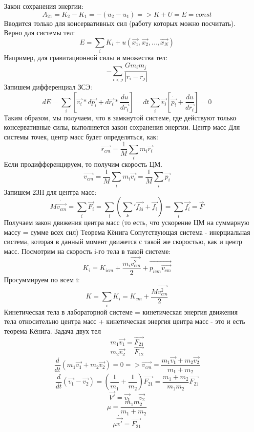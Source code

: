     Закон сохранения энергии:
    \[A_{21} = K_2 - K_1 = - (u_2 - u_1) => K + U = E = const\]
    Вводится только для консервативных сил (работу которых можно посчитать).
    Верно для системы тел:
    \[E = \sum_i K_i + u(\Vec{x_1}, \Vec{x_2}, ... , \Vec{x_N})\]
    Например, для гравитационной силы и множества тел:
    \[-\sum_{i<j} \frac{Gm_im_j}{|r_i - r_j|}\]
    Запишем дифференциал ЗСЭ:
    \[dE = \sum_i[\Vec{v_i} * d\Vec{p_i} + d\Vec{r_i} * \frac{du}{d\vec{r_i}}] = dt \sum_i \Vec{v_i}[\dot \Vec{p_i} + \frac{du}{d\Vec{r_i}}] = 0\]
    Таким образом, мы получаем, что в замкнутой системе, где действуют только консервативные силы, выполняется закон сохранения энергии.
    \newline Центр масс
    \newline Для системы точек, центр масс будет определяться, как:
    \[ \Vec{r_{cm}} = \frac{1}{M} \sum_i m_i\vec{r_i} \]
    Если продифференцируем, то получим скорость ЦМ.
    \[\Vec{v_{cm}} = \frac{1}{M} \sum_i m_i \Vec{v_i} = \frac{1}{M} \sum_i \Vec{p_i}\]
    Запишем 2ЗН для центра масс:
    \[M\dot\vec{v_{cm}} = \sum_i \vec{F_i} = \sum_i (\sum_k '\Vec{f_{ki}} + \Vec{f_i}) = \sum_i \Vec{f_i} = \Vec{F} \]
    Получаем закон движения центра масс (то есть, что ускорение ЦМ на суммарную массу = сумме всех сил)
    \newline Теорема Кёнига
    \newline Сопутствующая система - инерциальная система, которая в данный момент движется с такой же скоростью, как и центр масс.
    Посмотрим на скорость i-го тела в такой системе:
    \[K_i = K_{icm} + \frac{m_i\Vec{v_{cm}^2}}{2} + \Vec{p_{icm} \Vec{v_{cm}}}\]
    Просуммируем по всем i:
    \[K = \sum_i K_i = K_{cm} + \frac{M\Vec{v_{cm}^2}}{2}\]
    Кинетическая тела в лабораторной системе = кинетическая энергия движения тела относительно центра масс + кинетическая энергия центра масс - это и есть теорема Кёнига.
    \newline
    Задача двух тел
    \[m_1\Vec{v_1} = \Vec{F_{21}}\]
    \[m_2\Vec{v_2} = \Vec{F_{12}}\]
    \[\frac{d}{dt}(m_1\Vec{v_1} + m_2\Vec{v_2}) = 0 => \Vec{v_{cm}} = \frac{m_1\Vec{v_1} + m_2\Vec{v_2}}{m_1 + m_2}\]
    \[\frac{d}{dt} (\Vec{v_1} - \Vec{v_2}) = (\frac{1}{m_1} + \frac{1}{m_2})\Vec{F_{21}} = \frac{m_1 + m_2}{m_1m_2}\vec{F_{21}}\]
    \[\Vec{V'} = \Vec{v_1} - \Vec{v_2}\]
    \[\mu = \frac{m_1m_2}{m_1 + m_2}\]
    \[\mu \dot \Vec{v'} = \vec{F_{21}}\]